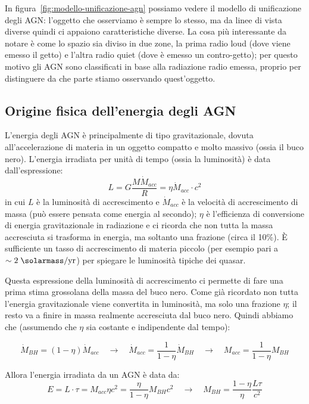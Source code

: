 In figura~\ref{fig:modello-unificazione-agn} possiamo vedere il modello di unificazione degli AGN: l'oggetto che osserviamo è sempre lo stesso, ma da linee di vista diverse quindi ci appaiono caratteristiche diverse. La cosa più interessante da notare è come lo spazio sia diviso in due zone, la prima radio loud (dove viene emesso il getto) e l'altra radio quiet (dove è emesso un contro-getto); per questo motivo gli AGN sono classificati in base alla radiazione radio emessa, proprio per distinguere da che parte stiamo osservando quest'oggetto. 

\subsection{Origine fisica dell'energia degli AGN}
L'energia degli AGN è principalmente di tipo gravitazionale, dovuta all'accelerazione di materia in un oggetto compatto e molto massivo (ossia il buco nero). L'energia irradiata per unità di tempo (ossia la luminosità) è data dall'espressione:
\begin{equation}
    \label{eq:luminosità-agn}
    L = G \frac{M\dot{M}_{acc}}{R}=\eta \dot{M}_{acc} \cdot c^2
\end{equation}
in cui $L$ è la luminosità di accrescimento e $\dot{M}_{acc}$ è la velocità di accrescimento di massa (può essere pensata come energia al secondo); $\eta$ è l'efficienza di conversione di energia gravitazionale in radiazione e ci ricorda che non tutta la massa accresciuta si trasforma in energia, ma soltanto una frazione (circa il 10\%). È sufficiente un tasso di accrescimento di materia piccolo (per esempio pari a $\sim 2 \;\si{\solarmass}/\si{yr}$) per spiegare le luminosità tipiche dei quasar. 

Questa espressione della luminosità di accrescimento ci permette di fare una prima stima grossolana della massa del buco nero. Come già ricordato non tutta l’energia gravitazionale viene convertita in luminosità, ma solo una frazione $\eta$; il resto va a finire in massa realmente accresciuta dal buco nero. Quindi abbiamo che (assumendo che $\eta$ sia costante e indipendente dal tempo):

\begin{equation*}
    \dot{M}_{BH} = (1-\eta) \dot{M}_{acc} \quad \rightarrow \quad \dot{M}_{acc} = \frac{1}{1 - \eta} \dot{M}_{BH}
    \quad \rightarrow \quad M_{acc} = \frac{1}{1 - \eta} M_{BH}
\end{equation*}

Allora l'energia irradiata da un AGN è data da:
\begin{equation*}
    E = L \cdot \tau =  M_{acc} \eta c^2 = \frac{\eta}{1 - \eta} M_{BH} c^2 \quad \rightarrow \quad M_{BH} = \frac{1-\eta}{\eta} \frac{L\tau}{c^2}
\end{equation*}

